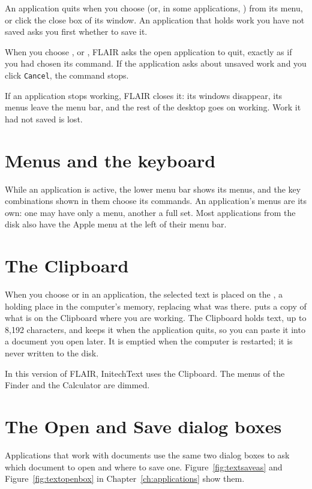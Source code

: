 An application quits when you choose  (or, in some
applications, ) from its  menu, or click the
close box of its window.  An application that holds work you have not
saved asks you first whether to save it.

When you choose ,  or , FLAIR asks the open application to quit, exactly as if you
had chosen its  command.  If the application asks about
unsaved work and you click \texttt{Cancel}, the command stops.

If an application stops working, FLAIR closes it: its windows disappear,
its menus leave the menu bar, and the rest of the desktop goes on working.
Work it had not saved is lost.

\section{Menus and the keyboard}
While an application is active, the lower menu bar shows its menus, and
the  key combinations shown in them choose its commands.  An
application's menus are its own: one may have only a  menu,
another a full set.  Most applications from the disk also have the Apple
menu at the left of their menu bar.

\section{The Clipboard}
When you choose  or  in an application, the
selected text is placed on the , a holding place in the
computer's memory, replacing what was there.   puts a copy
of what is on the Clipboard where you are working.  The Clipboard holds
text, up to 8,192 characters, and keeps it when the application quits, so
you can paste it into a document you open later.  It is emptied when the
computer is restarted; it is never written to the disk.

In this version of FLAIR, InitechText uses the Clipboard.  The
 menus of the Finder and the Calculator are dimmed.

\section{The Open and Save dialog boxes}
Applications that work with documents use the same two dialog boxes to ask
which document to open and where to save one.  Figure~\ref{fig:textsaveas}
and Figure~\ref{fig:textopenbox} in Chapter~\ref{ch:applications} show them.


